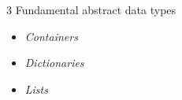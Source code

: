 3 Fundamental abstract data types

\begin{itemize}
	\item \emph{Containers}
	\item \emph{Dictionaries}
	\item \emph{Lists}
\end{itemize}